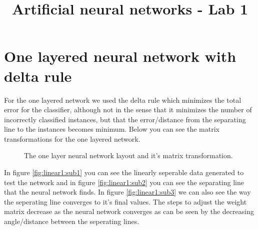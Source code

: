 \documentclass[a4paper,11pt]{article}
\title{\textbf{\huge{Artificial neural networks - Lab 1}}}
\begin{document}
\maketitle

\section{One layered neural network with delta rule}

For the one layered network we used the delta rule which minimizes the total error for the classifier, although not in the sense that it minimizes the number of incorrectly classified instances, but that the error/distance from the separating line to the instances becomes minimum. Below you can see the matrix transformations for the one layered network.

\vspace{5cm}
\begin{figure}[h!]
\caption{The one layer neural network layout and it's matrix transformation.}
\end{figure}

In figure \ref{fig:linear1:sub1} you can see the linearly seperable data generated to test the network and in figure \ref{fig:linear1:sub2} you can see the separating line that the neural network finds. In figure \ref{fig:linear1:sub3} we can also see the way the seperating line converges to it's final values. The steps to adjust the weight matrix decrease as the neural network converges as can be seen by the decreasing angle/distance between the seperating lines.
\end{document}
